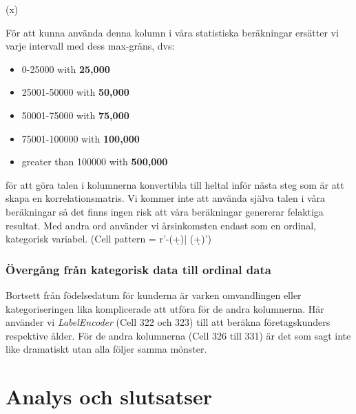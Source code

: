 \documentclass[]{article}
\begin{document}
\if(x)
\fi



För att kunna använda denna kolumn i våra statistiska beräkningar ersätter vi varje intervall med dess max-gräns, dvs:
\begin{itemize}[topsep=10pt, partopsep=0pt, itemsep=0.2em, parsep=0pt]
	\item[] 0-25000 with \textbf{25,000}
	\item[] 25001-50000 with \textbf{50,000}
	\item[] 50001-75000 with \textbf{75,000}
	\item[] 75001-100000 with \textbf{100,000}
	\item[] greater than 100000 with \textbf{500,000}
\end{itemize}
för att göra talen i kolumnerna konvertibla till heltal inför nästa steg som är att skapa en korrelationsmatris. Vi kommer inte att använda själva talen i våra beräkningar så det finns ingen risk att våra beräkningar genererar felaktiga resultat. Med andra ord använder vi årsinkomsten endast som en ordinal, kategorisk variabel. (Cell pattern = r'-(\d+)| (\d+)')

\subsubsection{Övergång från kategorisk data till ordinal data}

Bortsett från födelsedatum för kunderna är varken omvandlingen eller kategoriseringen lika komplicerade att utföra för de andra kolumnerna. Här använder vi \emph{LabelEncoder}  (Cell 322 och 323) till att beräkna företagskunders respektive ålder. För de andra kolumnerna (Cell 326 till 331) är det som sagt inte like dramatiskt utan alla följer samma mönster.

\section{Analys och slutsatser}
\end{document}

